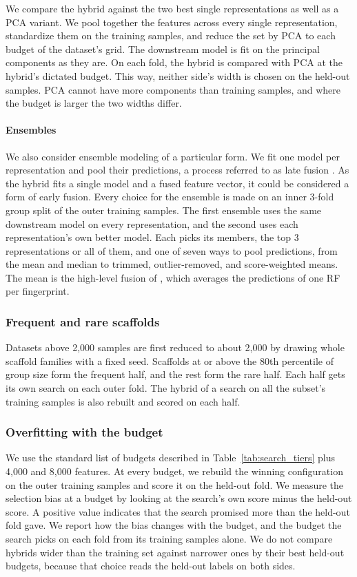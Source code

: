 We compare the hybrid against the two best single representations as well as a PCA variant. We pool together the features across every single representation, standardize them on the training samples, and reduce the set by PCA \citep{Jolliffe2016} to each budget of the dataset's grid. The downstream model is fit on the principal components as they are. On each fold, the hybrid is compared with PCA at the hybrid's dictated budget. This way, neither side's width is chosen on the held-out samples. PCA cannot have more components than training samples, and where the budget is larger the two widths differ. 

\paragraph{Ensembles}
We also consider ensemble modeling of a particular form. We fit one model per representation and pool their predictions, a process referred to as late fusion \citep{Stahlschmidt2022}. As the hybrid fits a single model and a fused feature vector, it could be considered a form of early fusion. Every choice for the ensemble is made on an inner 3-fold group split of the outer training samples. The first ensemble uses the same downstream model on every representation, and the second uses each representation's own better model. Each picks its members, the top 3 representations or all of them, and one of seven ways to pool predictions, from the mean and median to trimmed, outlier-removed, and score-weighted means. The mean is the high-level fusion of \citet{Turkina2025}, which averages the predictions of one RF per fingerprint.

\subsubsection{Frequent and rare scaffolds}
Datasets above 2{,}000 samples are first reduced to about 2{,}000 by drawing whole scaffold families with a fixed seed. Scaffolds at or above the 80th percentile of group size form the frequent half, and the rest form the rare half. Each half gets its own search on each outer fold. The hybrid of a search on all the subset's training samples is also rebuilt and scored on each half. 

\subsubsection{Overfitting with the budget}

We use the standard list of budgets described in Table~\ref{tab:search_tiers} plus 4{,}000 and 8{,}000 features. At every budget, we rebuild the winning configuration on the outer training samples and score it on the held-out fold. We measure the selection bias at a budget by looking at the search's own score minus the held-out score. A positive value indicates that the search promised more than the held-out fold gave. We report how the bias changes with the budget, and the budget the search picks on each fold from its training samples alone. We do not compare hybrids wider than the training set against narrower ones by their best held-out budgets, because that choice reads the held-out labels on both sides.

